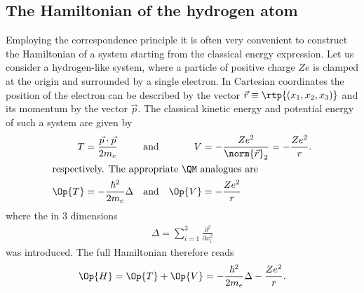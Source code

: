 \subsection{The Hamiltonian of the hydrogen atom}
Employing the correspondence principle it is often very convenient
to construct the \QM Hamiltonian of a system starting
from the classical energy expression.
Let us consider a hydrogen-like system,
where a particle of positive charge $Ze$
is clamped at the origin and surrounded by a single electron.
In Cartesian coordinates the position of the electron can be described
by the vector $\vec{r} \equiv \rtp{(x_1, x_2, x_3)}$ and its momentum by
the vector $\vec{p}$.
The classical kinetic energy and potential energy of such a system
are given by
\begin{align}
	T &= \frac{\vec{p} \cdot \vec{p}}{2 m_e} &
	&\text{and}&
	V &= - \frac{Ze^2}{\norm{\vec{r}}_2} = - \frac{Ze^2}{r}. \\
\intertext{respectively. The appropriate \QM analogues are}
	\Op{T} &= -\frac{\hbar^2}{2 m_e} \Delta &
	&\text{and}&
	\Op{V} &= - \frac{Ze^2}{r}
	\label{eqn:OpHydrogenConventional}
\end{align}
where the  in $3$ dimensions
\begin{align}
	\Delta = \sum_{i=1}^3 \frac{\partial^2}{\partial x_i^2}
	\label{eqn:LaplaceOperatorHydrogen}
\end{align}
was introduced. The full Hamiltonian therefore reads
\begin{equation}
	\Op{H} = \Op{T} + \Op{V} = -\frac{\hbar^2}{2 m_e} \Delta - \frac{Ze^2}{r}.
	\label{eqn:OpHydrogenFullUnits}
\end{equation}

